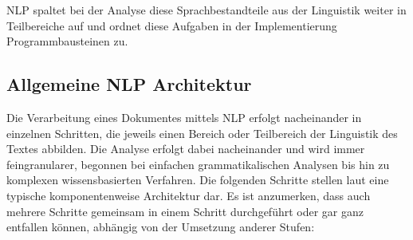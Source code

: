 \documentclass[12pt]{report}
\begin{document}
NLP spaltet bei der Analyse diese Sprachbestandteile aus der Linguistik weiter in Teilbereiche auf und ordnet diese Aufgaben in der Implementierung Programmbausteinen zu.

\subsection{Allgemeine NLP Architektur}
Die Verarbeitung eines Dokumentes mittels NLP erfolgt nacheinander in einzelnen Schritten, die jeweils einen Bereich oder Teilbereich der Linguistik des Textes abbilden. Die Analyse erfolgt dabei nacheinander und wird immer feingranularer, begonnen bei einfachen grammatikalischen Analysen bis hin zu komplexen wissensbasierten Verfahren. Die folgenden Schritte stellen laut \cite{cop04} eine typische komponentenweise Architektur dar. Es ist anzumerken, dass auch mehrere Schritte gemeinsam in einem Schritt durchgeführt oder gar ganz entfallen können, abhängig von der Umsetzung anderer Stufen:
\end{document}
